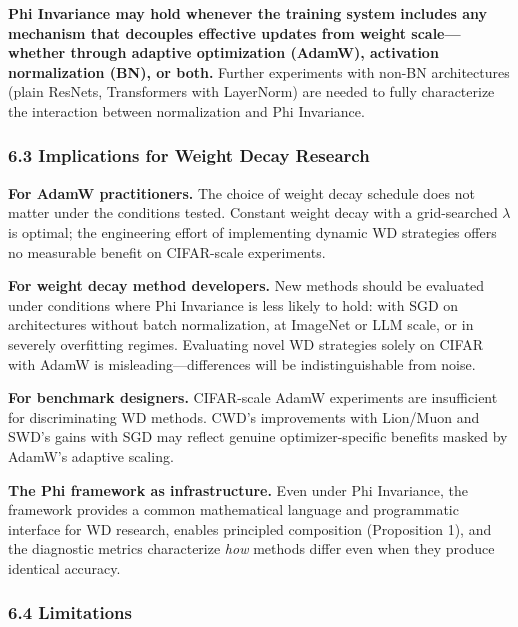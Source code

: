 \documentclass[
]{article}
\begin{document}
\textbf{Phi Invariance may hold whenever the training system includes
any mechanism that decouples effective updates from weight
scale---whether through adaptive optimization (AdamW), activation
normalization (BN), or both.} Further experiments with non-BN
architectures (plain ResNets, Transformers with LayerNorm) are needed to
fully characterize the interaction between normalization and Phi
Invariance.

\hypertarget{implications-for-weight-decay-research}{%
\subsubsection{6.3 Implications for Weight Decay
Research}\label{implications-for-weight-decay-research}}

\textbf{For AdamW practitioners.} The choice of weight decay schedule
does not matter under the conditions tested. Constant weight decay with
a grid-searched \(\lambda\) is optimal; the engineering effort of
implementing dynamic WD strategies offers no measurable benefit on
CIFAR-scale experiments.

\textbf{For weight decay method developers.} New methods should be
evaluated under conditions where Phi Invariance is less likely to hold:
with SGD on architectures without batch normalization, at ImageNet or
LLM scale, or in severely overfitting regimes. Evaluating novel WD
strategies solely on CIFAR with AdamW is misleading---differences will
be indistinguishable from noise.

\textbf{For benchmark designers.} CIFAR-scale AdamW experiments are
insufficient for discriminating WD methods. CWD's improvements with
Lion/Muon and SWD's gains with SGD may reflect genuine
optimizer-specific benefits masked by AdamW's adaptive scaling.

\textbf{The Phi framework as infrastructure.} Even under Phi Invariance,
the framework provides a common mathematical language and programmatic
interface for WD research, enables principled composition (Proposition
1), and the diagnostic metrics characterize \emph{how} methods differ
even when they produce identical accuracy.

\hypertarget{limitations}{%
\subsubsection{6.4 Limitations}\label{limitations}}
\end{document}
